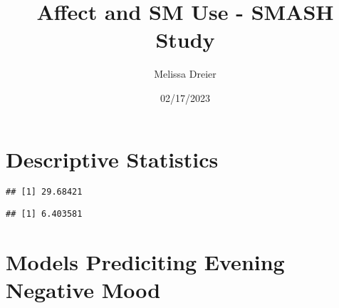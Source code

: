 \documentclass[
]{article}
\title{Affect and SM Use - SMASH Study}
\author{Melissa Dreier}
\date{02/17/2023}
\newenvironment{Shaded}{\begin{snugshade}}{\end{snugshade}}
\newcommand{\AttributeTok}[1]{\textcolor[rgb]{0.77,0.63,0.00}{#1}}
\newcommand{\CommentTok}[1]{\textcolor[rgb]{0.56,0.35,0.01}{\textit{#1}}}
\newcommand{\ConstantTok}[1]{\textcolor[rgb]{0.00,0.00,0.00}{#1}}
\newcommand{\DocumentationTok}[1]{\textcolor[rgb]{0.56,0.35,0.01}{\textbf{\textit{#1}}}}
\newcommand{\FunctionTok}[1]{\textcolor[rgb]{0.00,0.00,0.00}{#1}}
\newcommand{\NormalTok}[1]{#1}
\newcommand{\OtherTok}[1]{\textcolor[rgb]{0.56,0.35,0.01}{#1}}
\newcommand{\SpecialCharTok}[1]{\textcolor[rgb]{0.00,0.00,0.00}{#1}}
\begin{document}
\maketitle

\hypertarget{descriptive-statistics}{%
\section{Descriptive Statistics}\label{descriptive-statistics}}

\begin{Shaded}
\end{Shaded}

\begin{verbatim}
## [1] 29.68421
\end{verbatim}

\begin{Shaded}
\end{Shaded}

\begin{verbatim}
## [1] 6.403581
\end{verbatim}

\hypertarget{models-prediciting-evening-negative-mood}{%
\section{Models Prediciting Evening Negative
Mood}\label{models-prediciting-evening-negative-mood}}
\end{document}
